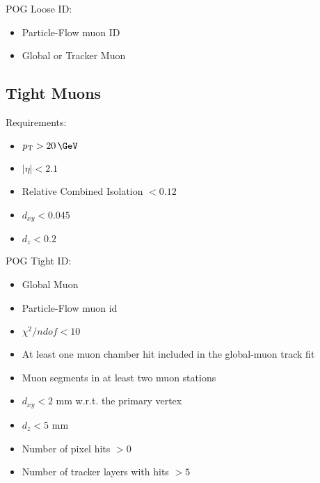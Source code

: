 POG Loose ID:
\begin{itemize}
  \item Particle-Flow muon ID
  \item Global or Tracker Muon
\end{itemize}


\subsection{Tight Muons}

Requirements:
\begin{itemize}
  \item $\pt>20\,\GeV$
  \item $|\eta|<2.1$
  \item Relative Combined Isolation $<0.12$
  \item $d_{xy}<0.045$
  \item $d_z < 0.2$
\end{itemize}

POG Tight ID:
\begin{itemize}
  \item Global Muon
  \item Particle-Flow muon id 
  \item $\chi^2/ndof < 10$
  \item At least one muon chamber hit included in the global-muon track fit
  \item Muon segments in at least two muon stations
  \item $d_{xy} < 2$ mm w.r.t. the primary vertex
  \item $d_z < 5$ mm
  \item Number of pixel hits $> 0$ 
  \item Number of tracker layers with hits $>5$
\end{itemize}


